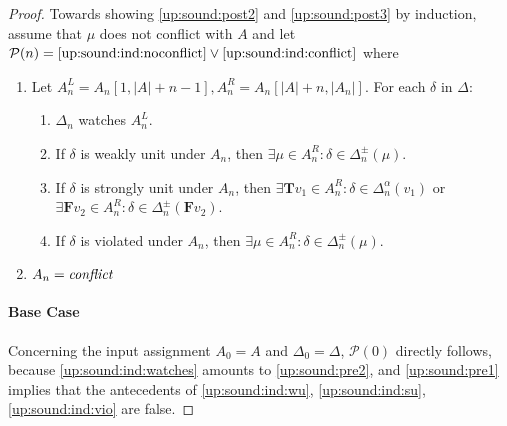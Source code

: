 \documentclass{vutinfth} %
\newcommand{\ass}{A}
\newcommand{\bT}{\mathbf{T}}
\newcommand{\bF}{\mathbf{F}}
\newcommand{\welf}{well formed\xspace}
\newcommand{\sgl}{\mu}
\begin{document}
\begin{proof}
Towards showing \ref{up:sound:post2} and \ref{up:sound:post3} by induction, assume that $\sgl$ does not conflict with $\ass$ and let $\mathcal{P}(n) = \textrm{\ref{up:sound:ind:noconflict}} \vee \textrm{\ref{up:sound:ind:conflict}}$ where

\begin{enumerate}[label=(\Roman*)]
	\item Let $\ass_n^L = \ass_n[1, |A| + n - 1], \ass_n^R = \ass_n[|A| + n, |\ass_n|]$. For each $\delta$ in $\Delta$: \label{up:sound:ind:noconflict}
		\begin{enumerate}[label=(\alph*),ref=\theenumi(\alph*)]
			\item $\Delta_n$ watches $\ass^L_n$. \label{up:sound:ind:watches} %
			\item If $\delta$ is weakly unit under $\ass_n$, then $\exists \sgl \in A_n^R : \delta \in \Delta_n^\pm(\sgl)$. \label{up:sound:ind:wu}
			\item If $\delta$ is strongly unit under $\ass_n$, then $\exists {\bT v_1} \in A_n^R : \delta \in \Delta_n^\alpha(v_1)$ or $\exists {\bF v_2} \in A_n^R : \delta \in \Delta_n^\pm({\bF v_2})$. \label{up:sound:ind:su}
			\item If $\delta$ is violated under $\ass_n$, then $\exists \sgl \in A_n^R : \delta \in \Delta_n^\pm(\sgl)$. \label{up:sound:ind:vio}
		\end{enumerate}
	\item $\ass_n = \emph{conflict}$ \label{up:sound:ind:conflict}
\end{enumerate}

\paragraph{Base Case} Concerning the input assignment $\ass_0 = \ass$ and $\Delta_0 = \Delta$, $\mathcal{P}(0)$ directly follows, because \ref{up:sound:ind:watches} amounts to \ref{up:sound:pre2}, and \ref{up:sound:pre1} implies that the antecedents of \ref{up:sound:ind:wu}, \ref{up:sound:ind:su}, \ref{up:sound:ind:vio} are false.




\end{proof}
\end{document}
